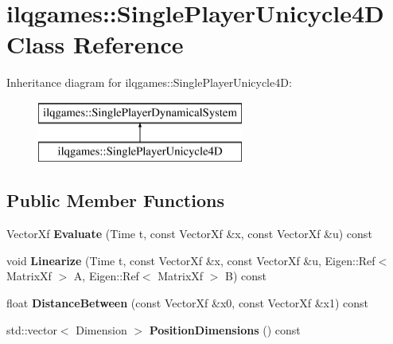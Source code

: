 \hypertarget{classilqgames_1_1_single_player_unicycle4_d}{}\section{ilqgames\+:\+:Single\+Player\+Unicycle4D Class Reference}
\label{classilqgames_1_1_single_player_unicycle4_d}
Inheritance diagram for ilqgames\+:\+:Single\+Player\+Unicycle4D\+:\begin{figure}[H]
\begin{center}
\leavevmode
\includegraphics[height=2.000000cm]{classilqgames_1_1_single_player_unicycle4_d}
\end{center}
\end{figure}
\subsection*{Public Member Functions}
\begin{DoxyCompactItemize}
\item 
Vector\+Xf {\bfseries Evaluate} (Time t, const Vector\+Xf \&x, const Vector\+Xf \&u) const \hypertarget{classilqgames_1_1_single_player_unicycle4_d_a2d09bc46b962db25724fe381d44ecd5f}{}\label{classilqgames_1_1_single_player_unicycle4_d_a2d09bc46b962db25724fe381d44ecd5f}

\item 
void {\bfseries Linearize} (Time t, const Vector\+Xf \&x, const Vector\+Xf \&u, Eigen\+::\+Ref$<$ Matrix\+Xf $>$ A, Eigen\+::\+Ref$<$ Matrix\+Xf $>$ B) const \hypertarget{classilqgames_1_1_single_player_unicycle4_d_a93c9058f39bb1cc26386c10bb643f842}{}\label{classilqgames_1_1_single_player_unicycle4_d_a93c9058f39bb1cc26386c10bb643f842}

\item 
float {\bfseries Distance\+Between} (const Vector\+Xf \&x0, const Vector\+Xf \&x1) const \hypertarget{classilqgames_1_1_single_player_unicycle4_d_a8e07e462f3b1efe63ae0f14ee286d657}{}\label{classilqgames_1_1_single_player_unicycle4_d_a8e07e462f3b1efe63ae0f14ee286d657}

\item 
std\+::vector$<$ Dimension $>$ {\bfseries Position\+Dimensions} () const \hypertarget{classilqgames_1_1_single_player_unicycle4_d_a5afe7f51a1c3c1884effcf38e4849c26}{}\label{classilqgames_1_1_single_player_unicycle4_d_a5afe7f51a1c3c1884effcf38e4849c26}

\end{DoxyCompactItemize}
